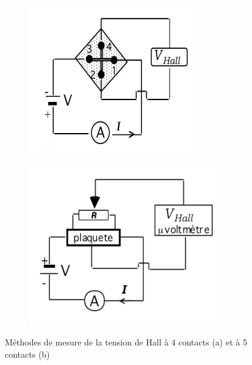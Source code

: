 \begin{minipage}{\textwidth}
    \begin{figure}
        \centering
        \begin{subfigure}{0.25\textwidth}
            \includegraphics[width=\linewidth]{figures/circuit_4branch.png}
            \caption{}
            \label{fig:4branch}
        \end{subfigure}%
        \begin{subfigure}{0.25\textwidth}
            \includegraphics[width=\linewidth]{figures/circuit_5branch.png}
            \caption{}
            \label{fig:5branch}
        \end{subfigure}
        \caption{Méthodes de mesure de la tension de Hall à 4 contacts (a) et à 5 contacts (b) \cite{notice}}
        \label{fig:circuit}
        \vspace*{1cm}
    \end{figure}


\end{minipage}
